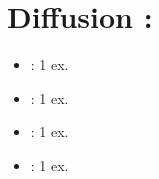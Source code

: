 \vspace{3cm}
\section*{Diffusion :}
\begin{itemize}
\item{\tuteurCEA : 1 ex.} 
\item{\tuteurecole : 1 ex.}
\item{\auteurrapport : 1 ex.}
\item{\cheflabo : 1 ex.}
\end{itemize}

